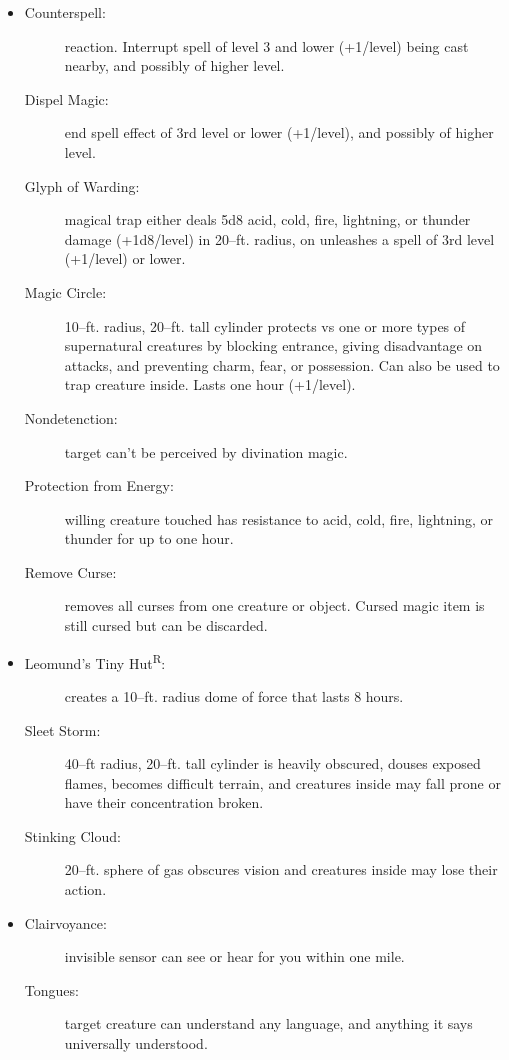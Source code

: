 \documentclass[DIV=14, paper=a4, fontsize=12pt, twocolumn, twoside]{scrartcl}
\begin{document}
\begin{itemize}[align=parleft,labelwidth=1cm]
	\renewcommand{\labelitemi}{Abjur}\item
	\begin{description}
 \item[Counterspell:] reaction. Interrupt spell of level 3 and lower (+1/level) being cast nearby, and possibly of higher level.
 \item[Dispel Magic:] end spell effect of 3rd level or lower (+1/level), and possibly of higher level.
 \item[Glyph of Warding:] magical trap either deals 5d8 acid, cold, fire, lightning, or thunder damage (+1d8/level) in 20–ft. radius, on unleashes a spell of 3rd level (+1/level) or lower.
 \item[Magic Circle:] 10–ft. radius, 20–ft. tall cylinder protects vs one or more types of supernatural creatures by blocking entrance, giving disadvantage on attacks, and preventing charm, fear, or possession. Can also be used to trap creature inside. Lasts one hour (+1/level).
 \item[Nondetenction:] target can’t be perceived by divination magic.
 \item[Protection from Energy:] willing creature touched has resistance to acid, cold, fire, lightning, or thunder for up to one hour.
 \item[Remove Curse:] removes all curses from one creature or object. Cursed magic item is still cursed but can be discarded.
\end{description}
\renewcommand{\labelitemi}{Conj}\item
\begin{description}
 \item[Leomund’s Tiny Hut\textsuperscript{R}:] creates a 10–ft. radius dome of force that lasts 8 hours.
 \item[Sleet Storm:] 40–ft radius, 20–ft. tall cylinder is heavily obscured, douses exposed flames, becomes difficult terrain, and creatures inside may fall prone or have their concentration broken.
 \item[Stinking Cloud:] 20–ft. sphere of gas obscures vision and creatures inside may lose their action.
\end{description}
\renewcommand{\labelitemi}{Div}\item
\begin{description}
 \item[Clairvoyance:] invisible sensor can see or hear for you within one mile.
 \item[Tongues:] target creature can understand any language, and anything it says universally understood.

\end{description}
\end{itemize}
\end{document}
